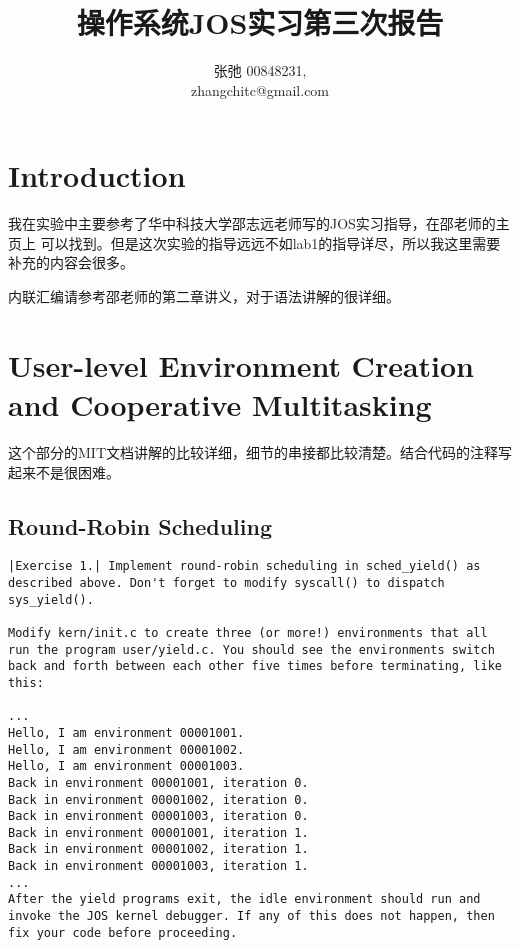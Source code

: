 \documentclass{article}
\begin{document}
\begin{CJK*}{UTF8}{gkai}

\title{操作系统JOS实习第三次报告}
\author{张弛 \hspace{1ex} 00848231, \\
        zhangchitc@gmail.com}

\maketitle
\tableofcontents
\newpage

\section{Introduction}

我在实验中主要参考了华中科技大学邵志远老师写的JOS实习指导，在邵老师的主页上 可以找到。但是这次实验的指导远远不如lab1的指导详尽，所以我这里需要补充的内容会很多。

内联汇编请参考邵老师的第二章讲义，对于语法讲解的很详细。


\section{User-level Environment Creation and Cooperative Multitasking}

这个部分的MIT文档讲解的比较详细，细节的串接都比较清楚。结合代码的注释写起来不是很困难。

\subsection{Round-Robin Scheduling}

\begin{lstlisting}[style=exercise]
|Exercise 1.| Implement round-robin scheduling in sched_yield() as described above. Don't forget to modify syscall() to dispatch sys_yield().

Modify kern/init.c to create three (or more!) environments that all run the program user/yield.c. You should see the environments switch back and forth between each other five times before terminating, like this:

...
Hello, I am environment 00001001.
Hello, I am environment 00001002.
Hello, I am environment 00001003.
Back in environment 00001001, iteration 0.
Back in environment 00001002, iteration 0.
Back in environment 00001003, iteration 0.
Back in environment 00001001, iteration 1.
Back in environment 00001002, iteration 1.
Back in environment 00001003, iteration 1.
...
After the yield programs exit, the idle environment should run and invoke the JOS kernel debugger. If any of this does not happen, then fix your code before proceeding.
\end{lstlisting}


\end{CJK*}
\end{document}
